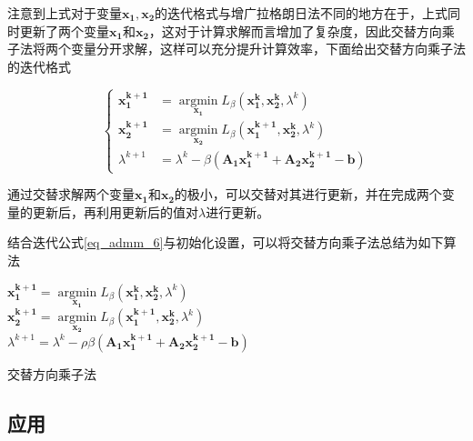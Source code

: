 注意到上式对于变量$\bm{x_{1}, x_{2}}$的迭代格式与增广拉格朗日法不同的地方在于，上式同时更新了两个变量$\bm{x_{1}}$和$\bm{x_{2}}$，这对于计算求解而言增加了复杂度，因此交替方向乘子法将两个变量分开求解，这样可以充分提升计算效率，下面给出交替方向乘子法的迭代格式

\begin{equation}\label{eq_admm_6}
    \begin{cases}
        \bm{x_{1}^{k+1}} &= \mathop{\mathrm{argmin}}\limits_{\bm{x_{1}}} L_{\beta}(\bm{x_{1}^{k}, x_{2}^{k}}, \lambda^{k}) \\
        \bm{x_{2}^{k+1}} &= \mathop{\mathrm{argmin}}\limits_{\bm{x_{2}}} L_{\beta}(\bm{x_{1}^{k+1}, x_{2}^{k}}, \lambda^{k}) \\
        \lambda^{k+1} &= \lambda^{k} - \beta (\bm{A_{1}x_{1}^{k+1} + A_{2}x_{2}^{k+1} - b})
    \end{cases}
\end{equation}

通过交替求解两个变量$\bm{x_{1}}$和$\bm{x_{2}}$的极小，可以交替对其进行更新，并在完成两个变量的更新后，再利用更新后的值对$\lambda$进行更新。

结合迭代公式\ref{eq_admm_6}与初始化设置，可以将交替方向乘子法\cite{2017ADMM}总结为如下算法

\begin{algorithm}\label{alg_admm_2}

    \SetAlgoLined

     {
        $\bm{x_{1}^{k+1}} = \mathop{\mathrm{argmin}}\limits_{\bm{x_{1}}} L_{\beta}(\bm{x_{1}^{k}, x_{2}^{k}}, \lambda^{k})$  \\        
        
        $\bm{x_{2}^{k+1}} = \mathop{\mathrm{argmin}}\limits_{\bm{x_{2}}} L_{\beta}(\bm{x_{1}^{k+1}, x_{2}^{k}}, \lambda^{k})$  \\

        $\lambda^{k+1} = \lambda^{k} - \rho \beta (\bm{A_{1}x_{1}^{k+1} + A_{2}x_{2}^{k+1} - b})$
    }
    \caption{交替方向乘子法}
\end{algorithm}

\subsection{应用}

